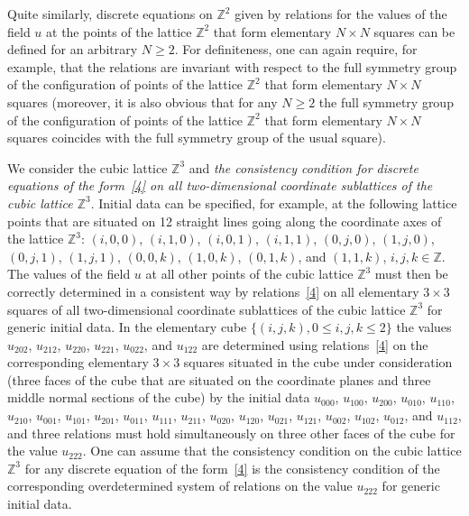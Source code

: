 Quite similarly, discrete equations on $\mathbb{Z}^2$ given by
relations for the values of the f\/ield $u$ at the points of the
lattice $\mathbb{Z}^2$ that form elementary $N \times N$ squares can
be def\/ined for an arbitrary $N \geq 2$. For def\/initeness, one can
again require, for example, that the relations are invariant with
respect to the full symmetry group of the conf\/iguration of points of
the lattice $\mathbb{Z}^2$ that form elementary $N \times N$ squares
(moreover, it is also obvious that for any $N \geq 2$ the full
symmetry group of the conf\/iguration of points of the lattice
$\mathbb{Z}^2$ that form elementary $N \times N$ squares coincides
with the full symmetry group of the usual square).


We consider the cubic lattice $\mathbb{Z}^3$ and {\it the
consistency condition for discrete equations of the form~\eqref{4}
on all two-dimensional coordinate sublattices of the
cubic lattice $\mathbb{Z}^3$}. Initial data can be specif\/ied, for
example, at the following lattice points that are situated on 12
straight lines going along the coordinate axes of the lattice
$\mathbb{Z}^3$: $(i, 0, 0)$, $(i, 1, 0)$, $(i, 0, 1)$, $(i, 1, 1)$,
$(0, j, 0)$, $(1, j, 0)$, $(0, j, 1)$, $(1, j, 1)$, $(0, 0, k)$,
$(1, 0, k)$, $(0, 1, k)$, and $(1, 1, k)$, $i, j, k \in \mathbb{Z}$.
The values of the f\/ield $u$ at all other points of the cubic lattice
$\mathbb{Z}^3$ must then be correctly determined in a consistent way
by relations~\eqref{4} on all elementary $3 \times 3$ squares of all
two-dimensional coordinate sublattices of the cubic lattice
$\mathbb{Z}^3$ for generic initial data. In the elementary cube
$\{(i, j, k), 0 \leq i, j, k \leq 2 \}$ the values $u_{2 0 2}$,
$u_{2 1 2}$, $u_{2 2 0}$, $u_{2 2 1}$, $u_{0 2 2}$, and $u_{1 2 2}$
are determined using relations~\eqref{4} on the corresponding
elementary $3 \times 3$ squares situated in the cube under
consideration (three faces of the cube that are situated on the coordinate planes
and three middle normal sections of the
cube) by the initial data $u_{0 0 0}$, $u_{1 0 0}$, $u_{2 0 0}$,
$u_{0 1 0}$, $u_{1 1 0}$, $u_{2 1 0}$, $u_{0 0 1}$, $u_{1 0 1}$,
$u_{2 0 1}$, $u_{0 1 1}$, $u_{1 1 1}$, $u_{2 1 1}$, $u_{0 2 0}$,
$u_{1 2 0}$, $u_{0 2 1}$, $u_{1 2 1}$, $u_{0 0 2}$, $u_{1 0 2}$,
$u_{0 1 2}$, and $u_{1 1 2}$, and three relations must hold
simultaneously on three other faces of the cube for the value $u_{2 2 2}$.
One can assume that the consistency condition on the cubic lattice
$\mathbb{Z}^3$ for any discrete equation of the form~\eqref{4} is
the consistency condition of the corresponding overdetermined system
of relations on the value $u_{2 2 2}$ for generic initial data.


